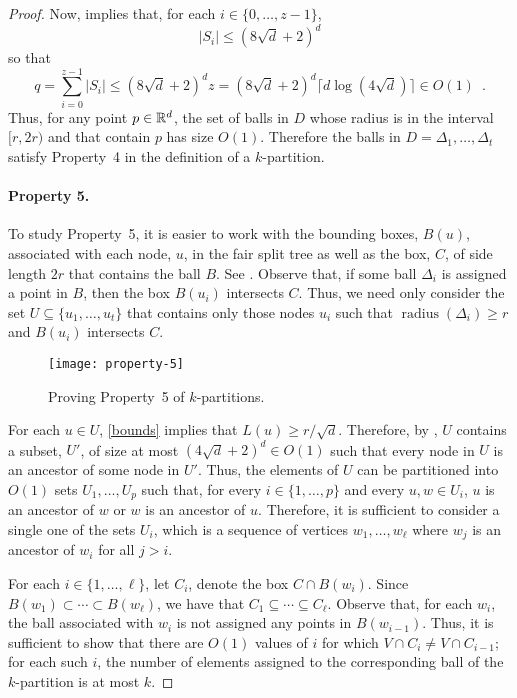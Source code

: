 \documentclass{patmorin}
\DeclareMathOperator{\radius}{radius}
\begin{document}
\begin{proof}
  Now,  implies that, for each $i\in\{0,\ldots,z-1\}$, 
  \[
     |S_i|\le (8\sqrt{d}+2)^d
  \]
  so that
  \[
     q = \sum_{i=0}^{z-1}|S_i|\le (8\sqrt{d}+2)^dz = (8\sqrt{d}+2)^d\lceil d\log(4\sqrt{d})\rceil  \in O(1) \enspace .
  \]
  Thus, for any point $p\in\mathbb{R}^d$, the set of balls in $D$ whose radius
  is in the interval $[r,2r)$ and that contain $p$ has size $O(1)$.
  Therefore the balls in $D=\Delta_1,\ldots,\Delta_t$ satisfy Property~4
  in the definition of a $k$-partition.

  \paragraph{Property 5.}
  To study Property~5, it is easier to work with the bounding boxes,
  $B(u)$, associated with each node, $u$, in the fair split tree as
  well as the box, $C$, of side length $2r$ that contains the ball $B$.
  See .  Observe that, if some ball $\Delta_i$
  is assigned a point in $B$, then the box $B(u_i)$ intersects $C$.
  Thus, we need only consider the set $U\subseteq\{u_1,\ldots,u_t\}$
  that contains only those nodes $u_i$ such that $\radius(\Delta_i)\ge r$
  and $B(u_i)$ intersects $C$.

  \begin{figure}
    \begin{center}
      \texttt{[image: property-5]}
    \end{center}
    \caption{Proving Property~5 of $k$-partitions.}
  \end{figure}

  For each $u\in U$, \eqref{bounds} implies that $L(u)\ge r/\sqrt{d}$.
  Therefore, by , $U$ contains a subset, $U'$,
  of size at most $(4\sqrt{d}+2)^d\in O(1)$ such that every node in
  $U$ is an ancestor of some node in $U'$.  Thus, the elements of $U$
  can be partitioned into $O(1)$ sets $U_1,\ldots,U_p$ such that, for
  every $i\in\{1,\ldots,p\}$ and every $u,w\in U_i$, $u$ is an ancestor
  of $w$ or $w$ is an ancestor of $u$.  Therefore, it is sufficient to
  consider a single one of the sets $U_i$, which is a sequence of vertices
  $w_1,\ldots,w_\ell$ where $w_j$ is an ancestor of $w_i$ for all $j>i$.

  For each $i\in\{1,\ldots,\ell\}$, let $C_{i}$, denote the box $C\cap
  B(w_{i})$.  Since $B(w_1)\subset\cdots\subset B(w_\ell)$, we have that
  $C_1\subseteq\cdots\subseteq C_\ell$. Observe that, for each $w_i$, the
  ball associated with $w_i$ is not assigned any points in $B(w_{i-1})$.
  Thus, it is sufficient to show that there are $O(1)$ values of $i$
  for which $V\cap C_i\neq V\cap C_{i-1}$; for each such $i$, the number
  of elements assigned to the corresponding ball of the $k$-partition
  is at most $k$.


\end{proof}
\end{document}
